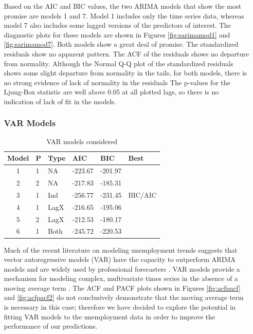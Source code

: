 \documentclass[twoside,twocolumn]{article}
\begin{document}
     
     
		Based on the AIC and BIC values, the two ARIMA models that show the most promise are models 1 and 7.  Model 1 includes only the time series data, whereas model 7 also includes some lagged versions of the predictors of interest.  The diagnostic plots for these models are shown in Figures \ref{fig:sarimamod1} and \ref{fig:sarimamod7}. Both models show a great deal of promise.  The standardized residuals show no apparent pattern. The ACF of the residuals shows no departure from normality. Although the Normal Q-Q plot of the standardized residuals shows some slight departure from normality in the tails, for both models, there is no strong evidence of lack of normality in the residuals  The p-values for the  Ljung-Box statistic are well above 0.05 at all plotted lags, so there is no indication of lack of fit in the models. 

      
      \subsubsection{VAR Models}
\begin{table}[htb]
\centering
\caption{VAR models considered}
\label{tab:varchoices}
\begin{tabular}{clllll}
  \hline
 Model & P & Type &  AIC & BIC & Best \\ 
  \hline
1  & 1 & NA  &  -223.67 & -201.97 &  \\ 
  2  & 2 & NA  &   -217.83 & -185.31 &  \\ 
  3  & 1 & Ind  & -256.77 & -231.45 & BIC/AIC \\ 
  4  & 1 & LagX & -216.65 & -195.06 &  \\ 
  5  & 2 & LagX & -212.53 & -180.17 &  \\ 
  6  & 1 & Both  & -245.72 & -220.53 &  \\ 
   \hline
\end{tabular}
\end{table}


      
     Much of the recent literature on modeling unemployment trends suggests that vector autoregressive models (VAR) have the capacity to outperform ARIMA models and are widely used by professional forecasters \citep{Meyer2015, Tasci2015, Barnichon2016}. VAR models provide a mechanism for modeling complex, multivariate times series in the absence of a moving average term \citep{Chatfield2001} . The ACF and PACF plots shown in Figures \ref{fig:acfpacf} and \ref{fig:acfpacf2} do not conclusively demonstrate that the moving average term is necessary in this case; therefore we have decided to explore the potential in fitting VAR models to the unemployment data in order to improve the performance of our predictions.  
\end{document}
